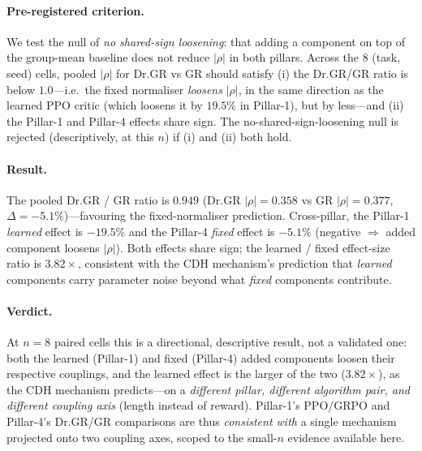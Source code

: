 \paragraph{Pre-registered criterion.}
We test the null of \emph{no shared-sign loosening}: that adding
a component on top of the group-mean baseline does not reduce
$|\rho|$ in both pillars. Across the 8 (task, seed) cells, pooled
$|\rho|$ for Dr.GR vs GR should satisfy (i) the Dr.GR/GR ratio is
below $1.0$---i.e.\ the fixed normaliser \emph{loosens} $|\rho|$,
in the same direction as the learned PPO critic (which loosens it
by $19.5\%$ in Pillar-1), but by less---and (ii) the Pillar-1 and
Pillar-4 effects share sign. The no-shared-sign-loosening null is
rejected (descriptively, at this $n$) if (i) and (ii) both hold.

\paragraph{Result.}
The pooled Dr.GR / GR ratio is $\mathbf{0.949}$ (Dr.GR
$|\rho|=0.358$ vs GR $|\rho|=0.377$, $\Delta=-5.1\%$)---favouring
the fixed-normaliser prediction. Cross-pillar, the Pillar-1
\emph{learned} effect is $-19.5\%$ and the Pillar-4 \emph{fixed}
effect is $-5.1\%$ (negative $\Rightarrow$ added component
loosens $|\rho|$). Both effects share sign; the learned / fixed
effect-size ratio is $\mathbf{3.82\times}$, consistent with the
CDH mechanism's prediction that \emph{learned} components carry
parameter noise beyond what \emph{fixed} components contribute.

\paragraph{Verdict.}
At $n{=}8$ paired cells this is a directional, descriptive
result, not a validated one: both the learned (Pillar-1) and
fixed (Pillar-4) added components loosen their respective
couplings, and the learned effect is the larger of the two
($3.82\times$), as the CDH mechanism predicts---on a
\emph{different pillar, different algorithm pair, and different
coupling axis} (length instead of reward). Pillar-1's PPO/GRPO
and Pillar-4's Dr.GR/GR comparisons are thus \emph{consistent
with} a single mechanism projected onto two coupling axes,
scoped to the small-$n$ evidence available here.
